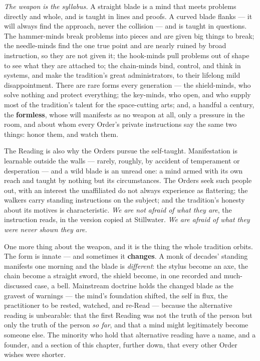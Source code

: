\textit{The weapon is the syllabus.} A straight blade is a mind that meets problems directly and whole, and is taught in lines and proofs. A curved blade flanks --- it will always find the approach, never the collision --- and is taught in questions. The hammer-minds break problems into pieces and are given big things to break; the needle-minds find the one true point and are nearly ruined by broad instruction, so they are not given it; the hook-minds pull problems out of shape to see what they are attached to; the chain-minds bind, control, and think in systems, and make the tradition's great administrators, to their lifelong mild disappointment. There are rare forms every generation --- the shield-minds, who solve nothing and protect everything; the key-minds, who open, and who supply most of the tradition's talent for the space-cutting arts; and, a handful a century, the \textbf{formless}, whose will manifests as no weapon at all, only a pressure in the room, and about whom every Order's private instructions say the same two things: honor them, and watch them.

The Reading is also why the Orders pursue the self-taught. Manifestation is learnable outside the walls --- rarely, roughly, by accident of temperament or desperation --- and a wild blade is an unread one: a mind armed with its own reach and taught by nothing but its circumstances. The Orders seek such people out, with an interest the unaffiliated do not always experience as flattering; the walkers carry standing instructions on the subject; and the tradition's honesty about its motives is characteristic. \textit{We are not afraid of what they are}, the instruction reads, in the version copied at Stillwater. \textit{We are afraid of what they were never shown they are.}

One more thing about the weapon, and it is the thing the whole tradition orbits. The form is innate --- and sometimes it \textbf{changes}. A monk of decades' standing manifests one morning and the blade is \textit{different}: the stylus become an axe, the chain become a straight sword, the shield become, in one recorded and much-discussed case, a bell. Mainstream doctrine holds the changed blade as the gravest of warnings --- the mind's foundation shifted, the self in flux, the practitioner to be rested, watched, and re-Read --- because the alternative reading is unbearable: that the first Reading was not the truth of the person but only the truth of the person \textit{so far}, and that a mind might legitimately become someone else. The minority who hold that alternative reading have a name, and a founder, and a section of this chapter, further down, that every other Order wishes were shorter.

